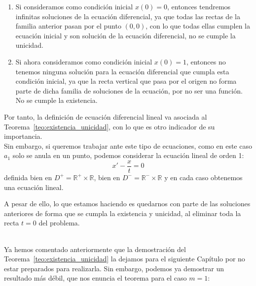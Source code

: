 \begin{ejemplo}
    \begin{enumerate}
        \item Si consideramos como condición inicial $x(0) = 0$, entonces tendremos infinitas soluciones de la ecuación diferencial, ya que todas las rectas de la familia anterior pasan por el punto $(0,0)$, con lo que todas ellas cumplen la ecuación inicial y son solución de la ecuación diferencial, no se cumple la unicidad.
        \item Si ahora consideramos como condición inicial $x(0)=1$, entonces no tenemos ninguna solución para la ecuación diferencial que cumpla esta condición inicial, ya que la recta vertical que pasa por el origen no forma parte de dicha familia de soluciones de la ecuación, por no ser una función. No se cumple la existencia.
    \end{enumerate}
    Por tanto, la definición de ecuación diferencial lineal va asociada al Teorema~\ref{teo:existencia_unicidad}, con lo que es otro indicador de su importancia.\\

    Sin embargo, si queremos trabajar ante este tipo de ecuaciones, como en este caso $a_1$ solo se anula en un punto, podemos considerar la ecuación lineal de orden 1:
    \begin{equation*}
        x' - \dfrac{x}{t} = 0
    \end{equation*}
    definida bien en $D^+ = \mathbb{R}^+\times \mathbb{R}$, bien en $D^- = \mathbb{R}^-\times \mathbb{R}$ y en cada caso obtenemos una ecuación lineal.

    A pesar de ello, lo que estamos haciendo es quedarnos con parte de las soluciones anteriores de forma que se cumpla la existencia y unicidad, al eliminar toda la recta $t=0$ del problema.
\end{ejemplo}~\\

Ya hemos comentado anteriormente que la demostración del Teorema~\ref{teo:existencia_unicidad} la dejamos para el siguiente Capítulo por no estar preparados para realizarla. Sin embargo, podemos ya demostrar un resultado más débil, que nos enuncia el teorema para el caso $m=1$:

